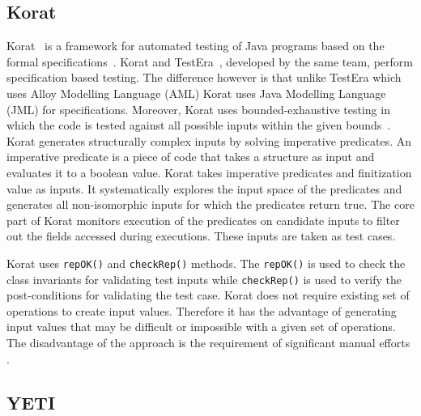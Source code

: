 \subsection{Korat} %
Korat~\cite{boyapati2002korat} is a framework for automated testing of Java programs based on the formal specifications~\cite{chang1999structural}. Korat and TestEra~\cite{marinov2001testera}, developed by the same team, perform specification based testing. The difference however is that unlike TestEra which uses Alloy Modelling Language (AML) Korat uses Java Modelling Language (JML) for specifications. Moreover, Korat uses bounded-exhaustive testing in which the code is tested against all possible inputs within the given bounds~\cite{khurshid2001checking}. Korat generates structurally complex inputs by solving imperative predicates. An imperative predicate is a piece of code that takes a structure as input and evaluates it to a boolean value. Korat takes imperative predicates and finitization value as inputs. It systematically explores the input space of the predicates and generates all non-isomorphic inputs for which the predicates return true. The core part of Korat monitors execution of the predicates on candidate inputs to filter out the fields accessed during executions. These inputs are taken as test cases. 

Korat uses \verb+repOK()+ and \verb+checkRep()+ methods. The \verb+repOK()+ is used to check the class invariants for validating test inputs while \verb+checkRep()+ is used to verify the post-conditions for validating the test case. Korat does not require existing set of operations to create input values. Therefore it has the advantage of generating input values that may be difficult or impossible with a given set of operations. The disadvantage of the approach is the requirement of significant manual efforts \cite{pacheco2009directed}.    


\subsection{YETI}






